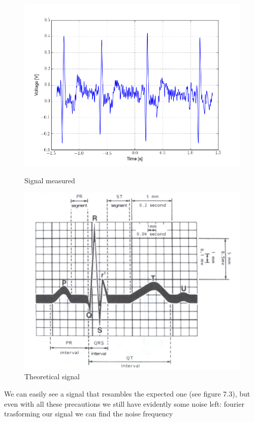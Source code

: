 \begin{figure}[H]
\begin{minipage}{.5\textwidth}
\centering
\includegraphics[width=\textwidth]{8/ecg.png}
\caption{Signal measured}
\end{minipage}%
\begin{minipage}{.5\textwidth}
\centering
\includegraphics[width=\textwidth]{8/theo.png}
\caption{Theoretical signal}
\end{minipage}
\end{figure}
We can easily see a signal that resambles the expected one (see figure 7.3), but even with all these precautions we still have evidently some noise left: fourier trasforming our signal we can find the noise frequency

